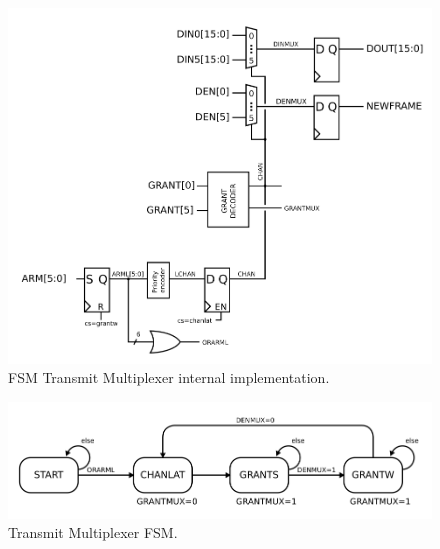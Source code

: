 \begin{figure}
\begin{centering}
\includegraphics[scale=0.8]{txmux.svg}
\end{centering}
\caption{FSM Transmit Multiplexer internal implementation.}
\label{txmux}
\end{figure}

\begin{figure}
\begin{centering}
\includegraphics[scale=0.8]{txmux.fsm.svg}
\end{centering}
\caption{Transmit Multiplexer FSM. }
\label{txmux.fsm}
\end{figure}


